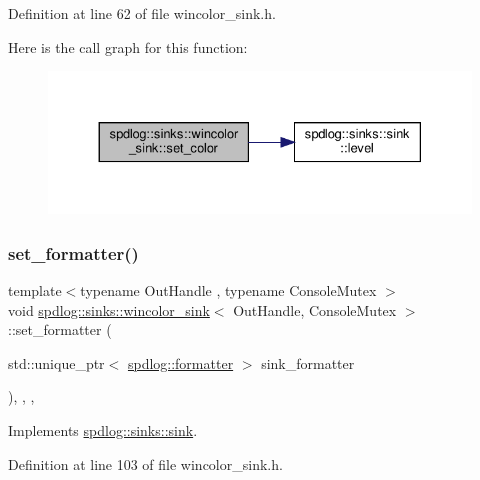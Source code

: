 Definition at line 62 of file wincolor\+\_\+sink.\+h.

Here is the call graph for this function\+:
\nopagebreak
\begin{figure}[H]
\begin{center}
\leavevmode
\includegraphics[width=330pt]{classspdlog_1_1sinks_1_1wincolor__sink_a914a0d9aed02627be8cd287a2dee9916_cgraph}
\end{center}
\end{figure}
\mbox{\label{classspdlog_1_1sinks_1_1wincolor__sink_a48cc1a252565bdbb66b12ba2a40e62f9}} 
\subsubsection{\texorpdfstring{set\+\_\+formatter()}{set\_formatter()}}
{\footnotesize\ttfamily template$<$typename Out\+Handle , typename Console\+Mutex $>$ \\
void \hyperlink{classspdlog_1_1sinks_1_1wincolor__sink}{spdlog\+::sinks\+::wincolor\+\_\+sink}$<$ Out\+Handle, Console\+Mutex $>$\+::set\+\_\+formatter (\begin{DoxyParamCaption}\item[{std\+::unique\+\_\+ptr$<$ \hyperlink{classspdlog_1_1formatter}{spdlog\+::formatter} $>$}]{sink\+\_\+formatter }\end{DoxyParamCaption})\hspace{0.3cm}{\ttfamily [inline]}, {\ttfamily [final]}, {\ttfamily [override]}, {\ttfamily [virtual]}}



Implements \hyperlink{classspdlog_1_1sinks_1_1sink_ac410f2229e583a75337a5fdf45d020be}{spdlog\+::sinks\+::sink}.



Definition at line 103 of file wincolor\+\_\+sink.\+h.

